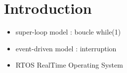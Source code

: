 \documentclass[resume]{subfiles}
\begin{document}
\section{Introduction}

\begin{itemize}
\item super-loop model : boucle while(1)
\item event-driven model : interruption
\item RTOS RealTime Operating System
\end{itemize}
\end{document}
